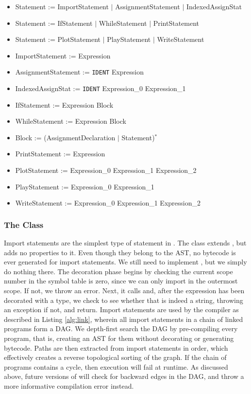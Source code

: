 \begin{itemize}
	\item Statement := ImportStatement $|$ AssignmentStatement $|$ IndexedAssignStat
	\item Statement := IfStatement $|$ WhileStatement $|$ PrintStatement
	\item Statement := PlotStatement $|$ PlayStatement $|$ WriteStatement
	\item ImportStatement := Expression
	\item AssignmentStatement := \texttt{IDENT} Expression
	\item IndexedAssignStat := \texttt{IDENT} Expression\_0 Expression\_1
	\item IfStatement := Expression Block
	\item WhileStatement := Expression Block
	\item Block := (AssignmentDeclaration $|$ Statement)$^*$
	\item PrintStatement := Expression
	\item PlotStatement := Expression\_0 Expression\_1 Expression\_2
	\item PlayStatement := Expression\_0 Expression\_1
	\item WriteStatement := Expression\_0 Expression\_1 Expression\_2
\end{itemize}

\subsubsection{The  Class}

Import statements are the simplest type of statement in . The  class extends , but adds no properties to it. Even though they belong to the AST, no bytecode is ever generated for import statements. We still need to implement , but we simply do nothing there. The decoration phase begins by checking the current scope number in the symbol table is zero, since we can only import in the outermost scope. If not, we throw an error. Next, it calls  and, after the expression has been decorated with a type, we check to see whether that is indeed a string, throwing an exception if not, and return. Import statements are used by the compiler as described in Listing \ref{alg:link}, wherein all import statements in a chain of linked programs form a DAG. We depth-first search the DAG by pre-compiling every program, that is, creating an AST for them without decorating or generating bytecode. Paths are then extracted from import statements in order, which effectively creates a reverse topological sorting of the graph. If the chain of programs contains a cycle, then execution will fail at runtime. As discussed above, future versions of  will check for backward edges in the DAG, and throw a more informative compilation error instead.

